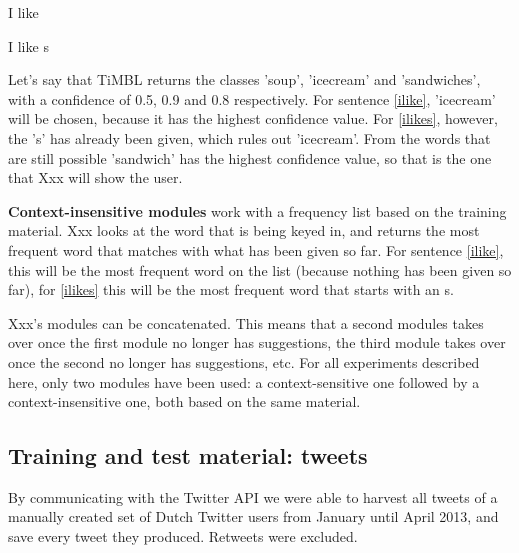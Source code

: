 \documentclass[11pt]{article}
\begin{document}
\begin{examples}
\item I like \label{ilike}
\item I like s \label{ilikes}
\end{examples}

Let's say that TiMBL returns the classes 'soup', 'icecream' and 'sandwiches', with a confidence of 0.5, 0.9 and 0.8 respectively. For sentence \ref{ilike}, 'icecream' will be chosen, because it has the highest confidence value. For \ref{ilikes}, however, the 's' has already been given, which rules out 'icecream'. From the words that are still possible 'sandwich' has the highest confidence value, so that is the one that Xxx will show the user.

\textbf{Context-insensitive modules} work with a frequency list based on the training material. Xxx looks at the word that is being keyed in, and returns the most frequent word that matches with what has been given so far. For sentence \ref{ilike}, this will be the most frequent word on the list (because nothing has been given so far), for \ref{ilikes} this will be the most frequent word that starts with an s.

Xxx's modules can be concatenated. This means that a second modules takes over once the first module no longer has suggestions, the third module takes over once the second no longer has suggestions, etc. For all experiments described here, only two modules have been used: a context-sensitive one followed by a context-insensitive one, both based on the same material.

\subsection{Training and test material: tweets}


By communicating with the Twitter API we were able to harvest all tweets of a manually created set of Dutch Twitter users from January until April 2013, and save every tweet they produced. Retweets were excluded.
\end{document}
